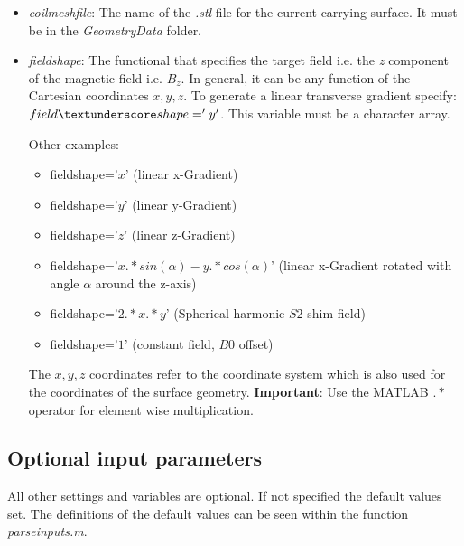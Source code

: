 \documentclass[a4paper,12pt]{book}
\begin{document}
\begin{itemize}
\item  \textit{coil\textunderscore mesh\textunderscore file}: The name of the \textit{.stl} file for the current carrying surface.  It must be in the\textit{ Geometry\textunderscore Data} folder.
\item  \textit{field\textunderscore shape}: The functional that specifies the target field i.e. the \textit{z} component of the magnetic field i.e. $B_{z}$. In general, it can be any function of the Cartesian coordinates $x,y,z$. To generate a linear transverse gradient specify: $field\textunderscore shape='y'$. This variable must be a character array. 

Other examples: 
\begin{itemize}
	\item  field\textunderscore shape='$x$' (linear x-Gradient)
	\item  field\textunderscore shape='$y$' (linear y-Gradient)
	\item  field\textunderscore shape='$z$' (linear z-Gradient)
	\item  field\textunderscore shape='$x.*sin(\alpha)-y.*cos(\alpha)$' (linear x-Gradient rotated with angle $\alpha$ around the z-axis)
	\item  field\textunderscore shape='$2.*x.*y$' (Spherical harmonic $S2$ shim field)
	\item  field\textunderscore shape='$1$' (constant field,  $B0$ offset)
\end{itemize}

The $x,y,z$ coordinates refer to the coordinate system which is also used for the coordinates of the surface geometry.
\textbf{Important}: Use the MATLAB $.*$ operator for element wise multiplication.

\end{itemize}

\newpage

\subsection{Optional input parameters}

All other settings and variables are optional. If not specified the default values set. The definitions of the default values can be seen within the function \textit{parse\textunderscore inputs.m}.
\end{document}
